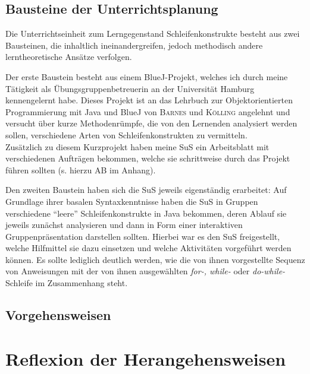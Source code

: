 \documentclass[paper=a4, DIV=13, BCOR=12mm, twoside=on, onecolumn=on, open = any, titlepage =on, parskip =half-, headsepline = on, footsepline = on, chapterprefix = on, sectionprefix = on, appendixprefix = off, fontsize = 11pt, numbers = noenddot, abstract = off]{scrreprt}
\begin{document}
\par \singlespacing
 \section{Bausteine der Unterrichtsplanung}
\onehalfspacing

Die Unterrichtseinheit zum Lerngegenstand Schleifenkonstrukte besteht aus zwei Bausteinen, die inhaltlich ineinandergreifen, jedoch methodisch andere lerntheoretische Ansätze verfolgen.

Der erste Baustein besteht aus einem BlueJ-Projekt, welches ich durch meine Tätigkeit als Übungsgruppenbetreuerin an der Universität Hamburg kennengelernt habe. Dieses Projekt ist an das Lehrbuch zur Objektorientierten Programmierung mit Java und BlueJ von \textsc{Barnes} und \textsc{Kölling} angelehnt und versucht über kurze Methodenrümpfe, die von den Lernenden analysiert werden sollen, verschiedene Arten von Schleifenkonstrukten zu vermitteln.\\
Zusätzlich zu diesem Kurzprojekt haben meine SuS ein Arbeitsblatt mit verschiedenen Aufträgen bekommen, welche sie schrittweise durch das Projekt führen sollten (s. hierzu AB im Anhang). 

Den zweiten Baustein haben sich die SuS jeweils eigenständig erarbeitet: Auf Grundlage ihrer basalen Syntaxkenntnisse haben die SuS in Gruppen verschiedene "`leere"' Schleifenkonstrukte in Java bekommen, deren Ablauf sie jeweils zunächst analysieren und dann in Form einer interaktiven Gruppenpräsentation darstellen sollten. Hierbei war es den SuS freigestellt, welche Hilfmittel sie dazu einsetzen und welche Aktivitäten vorgeführt werden können. Es sollte lediglich deutlich werden, wie die von ihnen vorgestellte Sequenz von Anweisungen mit der von ihnen ausgewählten \emph{for-, while-} oder \emph{do-while-}Schleife im Zusammenhang steht.

\par \singlespacing
 \section{Vorgehensweisen}
 \label{sec:vorgehensweisen}
\onehalfspacing


\par \singlespacing
 \chapter{Reflexion der Herangehensweisen}
\onehalfspacing
\end{document}
